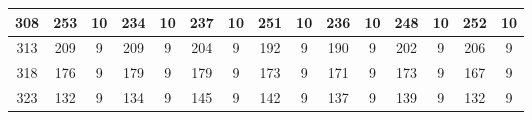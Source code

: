 \begin{table}[H]
{\begin{tabular}{|c|cccccccccccccc|}
308                                   & \multicolumn{1}{c|}{253}     & \multicolumn{1}{c|}{10}                                 & \multicolumn{1}{c|}{234}       & \multicolumn{1}{c|}{10}                                 & \multicolumn{1}{c|}{237}       & \multicolumn{1}{c|}{10}                                 & \multicolumn{1}{c|}{251}       & \multicolumn{1}{c|}{10}                                 & \multicolumn{1}{c|}{236}       & \multicolumn{1}{c|}{10}                                 & \multicolumn{1}{c|}{248}       & \multicolumn{1}{c|}{10}                                 & \multicolumn{1}{c|}{252}       & 10                                 \\ \hline
313                                   & \multicolumn{1}{c|}{209}     & \multicolumn{1}{c|}{9}                                  & \multicolumn{1}{c|}{209}       & \multicolumn{1}{c|}{9}                                  & \multicolumn{1}{c|}{204}       & \multicolumn{1}{c|}{9}                                  & \multicolumn{1}{c|}{192}       & \multicolumn{1}{c|}{9}                                  & \multicolumn{1}{c|}{190}       & \multicolumn{1}{c|}{9}                                  & \multicolumn{1}{c|}{202}       & \multicolumn{1}{c|}{9}                                  & \multicolumn{1}{c|}{206}       & 9                                  \\ \hline
318                                   & \multicolumn{1}{c|}{176}     & \multicolumn{1}{c|}{9}                                  & \multicolumn{1}{c|}{179}       & \multicolumn{1}{c|}{9}                                  & \multicolumn{1}{c|}{179}       & \multicolumn{1}{c|}{9}                                  & \multicolumn{1}{c|}{173}       & \multicolumn{1}{c|}{9}                                  & \multicolumn{1}{c|}{171}       & \multicolumn{1}{c|}{9}                                  & \multicolumn{1}{c|}{173}       & \multicolumn{1}{c|}{9}                                  & \multicolumn{1}{c|}{167}       & 9                                  \\ \hline
323                                   & \multicolumn{1}{c|}{132}     & \multicolumn{1}{c|}{9}                                  & \multicolumn{1}{c|}{134}       & \multicolumn{1}{c|}{9}                                  & \multicolumn{1}{c|}{145}       & \multicolumn{1}{c|}{9}                                  & \multicolumn{1}{c|}{142}       & \multicolumn{1}{c|}{9}                                  & \multicolumn{1}{c|}{137}       & \multicolumn{1}{c|}{9}                                  & \multicolumn{1}{c|}{139}       & \multicolumn{1}{c|}{9}                                  & \multicolumn{1}{c|}{132}       & 9                                  \\ \hline

\end{tabular}}
\end{table}
